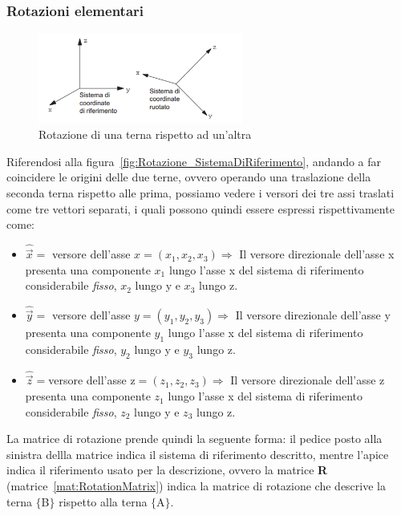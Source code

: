 \subsubsection{Rotazioni elementari}
\label{subsub:Rot_elementari}
\begin{figure}[h]
	\centering
	\includegraphics[width=0.6\textwidth]{Immagini/Rotazione_SistemiDiRiferimento}
	\caption{Rotazione di una terna rispetto ad un'altra}
	\label{fig:Rotazione_SistemaDiRiferimento}
\end{figure}
 Riferendosi alla figura~\vref{fig:Rotazione_SistemaDiRiferimento}, andando a far coincidere le origini delle due terne, ovvero operando una traslazione della seconda terna rispetto alle prima, possiamo vedere i versori dei tre assi traslati come tre vettori separati, i quali possono quindi essere espressi rispettivamente come:
 \begin{itemize}
 	\item $\hat{\vec{x}}= $ versore dell'asse $ x=(x_1,x_2,x_3)\Rightarrow$ Il versore direzionale dell'asse x  presenta una componente $x_1$ lungo l'asse x del sistema di riferimento considerabile \emph{fisso}, $x_2$ lungo y e $x_3$ lungo z.
 	\item $\hat{\vec{y}}=$ versore dell'asse $y=(y_1,y_2,y_3)\Rightarrow$ Il versore direzionale dell'asse y  presenta una componente $y_1$ lungo l'asse x del sistema di riferimento considerabile \emph{fisso}, $y_2$ lungo y e $y_3$ lungo z.
 	\item $\hat{\vec{z}}=$versore dell'asse z$=(z_1,z_2,z_3)\Rightarrow$ Il versore direzionale dell'asse z  presenta una componente $z_1$ lungo l'asse x del sistema di riferimento considerabile \emph{fisso}, $z_2$ lungo y e $z_3$ lungo z.
 \end{itemize}
La matrice di rotazione prende quindi la seguente forma: il pedice posto alla sinistra dellla matrice indica il sistema di riferimento descritto, mentre l'apice indica il riferimento usato per la descrizione, ovvero la matrice \textbf{R} (matrice~\vref{mat:RotationMatrix}) indica la matrice di rotazione che descrive la terna $\{$B$\}$ rispetto alla terna $\{$A$\}$.
